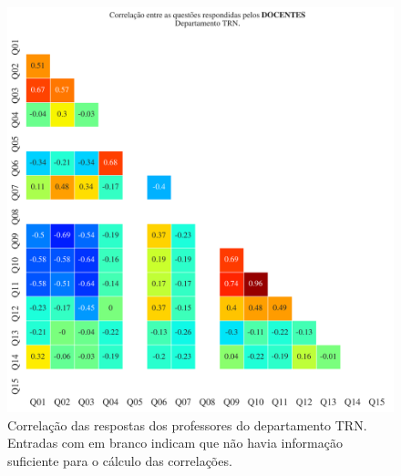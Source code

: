 \documentclass[a4paper,10pt]{article}
\begin{document}
\begin{figure}[h]
\centering
\includegraphics[width=0.999\linewidth]{matriz_corr__TRN_docentes.png}
\caption{\label{fig:corr_docentes}Correlação das respostas dos professores do departamento TRN. Entradas com em branco indicam que não havia informação suficiente para o cálculo das correlações.}
\end{figure}
\end{document}
